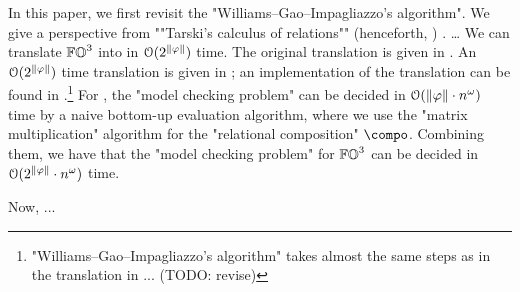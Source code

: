 In this paper, we first revisit the "Williams--Gao--Impagliazzo's algorithm".
We give a perspective from ""Tarski's calculus of relations"" (henceforth, \reintro*{}) \cite{tarskiCalculusRelations1941}.
\dots
We can translate $\mathbb{FO}^{3}$  into   in $\mathcal{O}(2^{\len{\fml}})$ time.
The original translation is given in \cite{tarskiFormalizationSetTheory1987}.
An $\mathcal{O}(2^{\len{\fml}})$ time translation is given in \cite{nakamuraExpressivePowerSuccinctness2022}; an implementation of the translation \cite{nakamuraExpressivePowerSuccinctness2020,nakamuraExpressivePowerSuccinctness2022} can be found in \cite{brogniTranslatingFirstOrderPredicate2023}.\footnote{"Williams--Gao--Impagliazzo's algorithm" takes almost the same steps as in the translation in \cite{nakamuraExpressivePowerSuccinctness2022}... (TODO: revise)}
For  , the "model checking problem" can be decided in $\mathcal{O}(\len{\fml} \cdot n^{\omega})$ time by a naive bottom-up evaluation algorithm,
where we use the "matrix multiplication" algorithm for the "relational composition" $\compo$.
Combining them, we have that the "model checking problem" for $\mathbb{FO}^{3}$  can be decided in $\mathcal{O}(2^{\len{\fml}} \cdot n^{\omega})$ time.


Now, 
...

